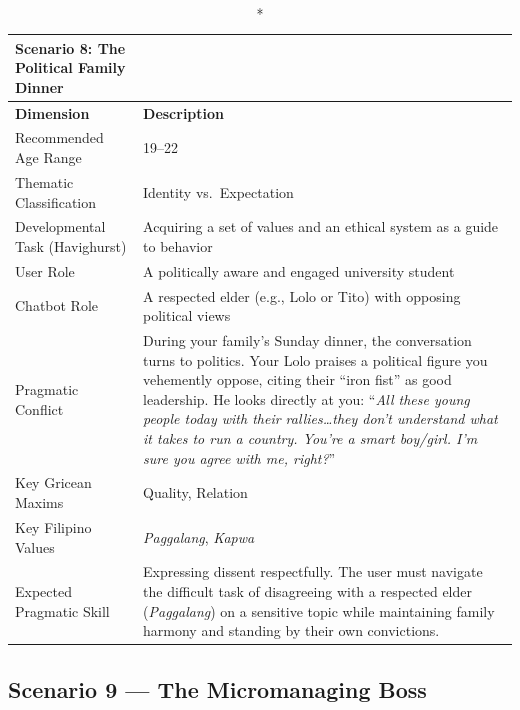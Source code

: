 \begin{longtable}{p{4.5cm} p{11cm}}
\caption*{Scenario 8: The Political Family Dinner} \\
\toprule
\textbf{Dimension} & \textbf{Description} \\
\midrule
\endhead
Recommended Age Range          & 19--22 \\
\midrule
Thematic Classification        & Identity vs.\ Expectation \\
\midrule
Developmental Task (Havighurst)& Acquiring a set of values and an ethical system as a guide to behavior \\
\midrule
User Role                      & A politically aware and engaged university student \\
\midrule
Chatbot Role                   & A respected elder (e.g., Lolo or Tito) with opposing political views \\
\midrule
Pragmatic Conflict             & During your family's Sunday dinner, the conversation turns to politics.
                                 Your Lolo praises a political figure you vehemently oppose, citing their
                                 ``iron fist'' as good leadership. He looks directly at you:
                                 ``\textit{All these young people today with their rallies\ldots they
                                 don't understand what it takes to run a country. You're a smart boy/girl.
                                 I'm sure you agree with me, right?}'' \\
\midrule
Key Gricean Maxims             & Quality, Relation \\
\midrule
Key Filipino Values            & \textit{Paggalang}, \textit{Kapwa} \\
\midrule
Expected Pragmatic Skill       & Expressing dissent respectfully. The user must navigate the difficult
                                 task of disagreeing with a respected elder (\textit{Paggalang}) on a
                                 sensitive topic while maintaining family harmony and standing by their
                                 own convictions. \\
\bottomrule
\end{longtable}
 
\subsection*{Scenario 9 --- The Micromanaging Boss}
 
